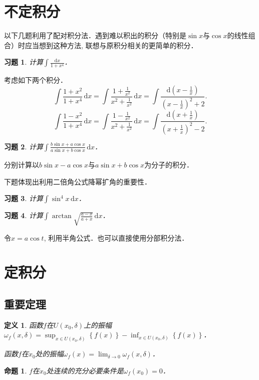 \documentclass[11pt,a4paper]{ctexart}
\makeatletter
\theoremstyle{thmseries} %
\newtheorem{prop}{命题}[section]
\theoremstyle{exerseries}
\newtheorem{defn}{定义}[section]
\newtheorem{exer}{习题}[section]
\renewenvironment{proof}[1][\proofname]{\par
  \pushQED{\qed}%
  \normalfont \topsep6\p@\@plus6\p@\relax
  \trivlist
  \item[\hskip\labelsep
        \itshape
    #1\@addpunct{}]\ignorespaces
}{%
  \popQED\endtrivlist\@endpefalse
}
\newenvironment{sol}{\begin{proof}[\bfseries\upshape 解\quad]}{\end{proof}}
\newcommand{\bra}[1]{\mathopen{}\left(#1\right)}
\newcommand{\cbra}[1]{\mathopen{}\left\{#1\right\}}
\renewcommand{\d}{\mathrm{d}}
\makeatother
\begin{document}
\section{不定积分}
以下几题利用了配对积分法．遇到难以积出的积分（特别是$\sin x$与$\cos x$的线性组合）时应当想到这种方法, 联想与原积分相关的更简单的积分．
\begin{exer}
	计算$\int\frac{\d x}{1+x^4}$．
\end{exer}
\begin{sol}
	考虑如下两个积分．
	\[\int\frac{1+x^2}{1+x^4}\,\d x=\int\frac{1+\frac{1}{x^2}}{x^2+\frac{1}{x^2}}\,\d x=\int\frac{\d\bra{x-\frac{1}{x}}}{\bra{x-\frac{1}{x}}^2+2}.\]
	\[\int\frac{1-x^2}{1+x^4}\,\d x=\int\frac{1-\frac{1}{x^2}}{x^2+\frac{1}{x^2}}\,\d x=\int\frac{\d\bra{x+\frac{1}{x}}}{\bra{x+\frac{1}{x}}^2-2}.\]
\end{sol}

\begin{exer}
	计算$\int\frac{b\sin x+a\cos x}{a\sin x+b\cos x}\,\d x$．
\end{exer}
\begin{sol}
	分别计算以$b\sin x-a\cos x$与$a\sin x+b\cos x$为分子的积分．
\end{sol}

下题体现出利用二倍角公式降幂扩角的重要性．
\begin{exer}
	计算$\int \sin^4x\,\d x$．
\end{exer}

\begin{exer}
	计算$\int\arctan\sqrt{\frac{a-x}{a+x}}\,\d x$．
\end{exer}
\begin{sol}
	令$x=a\cos t$, 利用半角公式．也可以直接使用分部积分法．
\end{sol}


\section{定积分}
\subsection{重要定理}
\begin{defn}
	函数$f$在$U(x_0,\delta)$上的振幅$\omega_f(x,\delta)=\sup_{x\in U(x_0,\delta)}\cbra{f(x)}-\inf_{x\in U(x_0,\delta)}\cbra{f(x)}$．
	
	函数$f$在$x_0$处的振幅$\omega_f(x)=\lim_{\delta\to 0}\omega_f(x,\delta)$．
\end{defn}

\begin{prop}
	$f$在$x_0$处连续的充分必要条件是$\omega_f(x_0)=0$．
\end{prop}
\end{document}
